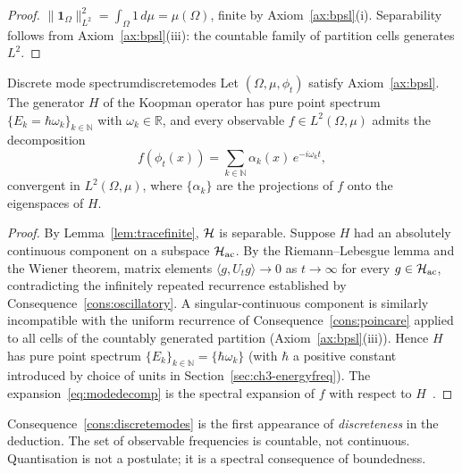 \begin{proof}
$\|\mathbf{1}_{\Omega}\|^{2}_{L^{2}}=\int_{\Omega}1\,d\mu=\mu(\Omega)$,
finite by Axiom~\ref{ax:bpsl}(i).
Separability follows from Axiom~\ref{ax:bpsl}(iii): the countable family
of partition cells generates $L^{2}$.
\end{proof}

\begin{consequence}{Discrete mode spectrum}{discretemodes}
Let $(\Omega,\mu,\phi_{t})$ satisfy Axiom~\ref{ax:bpsl}.
The generator $H$ of the Koopman operator has pure point spectrum
$\{E_{k}=\hbar\omega_{k}\}_{k\in\mathbb{N}}$ with $\omega_{k}\in\mathbb{R}$,
and every observable $f\in L^{2}(\Omega,\mu)$ admits the decomposition
\begin{equation}
  f(\phi_{t}(x))
  = \sum_{k\in\mathbb{N}}\alpha_{k}(x)\,e^{-i\omega_{k}t},
  \label{eq:modedecomp}
\end{equation}
convergent in $L^{2}(\Omega,\mu)$, where $\{\alpha_{k}\}$ are the
projections of $f$ onto the eigenspaces of $H$.
\end{consequence}

\begin{proof}
By Lemma~\ref{lem:tracefinite}, $\mathcal{H}$ is separable.
Suppose $H$ had an absolutely continuous component on a subspace
$\mathcal{H}_{\mathrm{ac}}$.
By the Riemann--Lebesgue lemma and the Wiener theorem, matrix elements
$\langle g,U_{t}g\rangle\to 0$ as $t\to\infty$ for every
$g\in\mathcal{H}_{\mathrm{ac}}$, contradicting the infinitely repeated
recurrence established by Consequence~\ref{cons:oscillatory}.
A singular-continuous component is similarly incompatible with the uniform
recurrence of Consequence~\ref{cons:poincare} applied to all cells of
the countably generated partition (Axiom~\ref{ax:bpsl}(iii)).
Hence $H$ has pure point spectrum $\{E_{k}\}_{k\in\mathbb{N}}=
\{\hbar\omega_{k}\}$ (with $\hbar$ a positive constant introduced by
choice of units in Section~\ref{sec:ch3-energyfreq}).
The expansion~\eqref{eq:modedecomp} is the spectral expansion of $f$
with respect to $H$~\citep{reed1980}.
\end{proof}

\begin{remark}
Consequence~\ref{cons:discretemodes} is the first appearance of
\emph{discreteness} in the deduction.
The set of observable frequencies is countable, not continuous.
Quantisation is not a postulate; it is a spectral consequence of
boundedness.
\end{remark}

